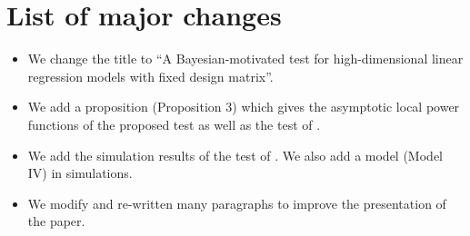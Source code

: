 \documentclass[11pt]{article}
\theoremstyle{plain}
\theoremstyle{definition}
\theoremstyle{remark}
\begin{document}
\section{List of major changes}
\begin{itemize}
    \item 
 We change the title to ``A Bayesian-motivated test for high-dimensional linear regression models with fixed design matrix''.
    \item
        We add a proposition (Proposition 3) which gives the asymptotic local power functions of the proposed test as well as the test of \cite{Goeman2006}.
    \item
        We add the simulation results of the test of \cite{zhang2016simultaneous}.
        We also add a model (Model IV) in simulations.
    \item
We modify and re-written many paragraphs to improve the presentation of the paper.
\end{itemize}








\end{document}
